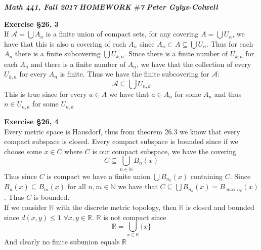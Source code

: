 \documentclass[12pt]{article}
\newenvironment{ques}[1]{\textbf{Exercise #1}\vspace{1 mm}\\ }{\bigskip}
\theoremstyle{definition}
\newcommand{\R}{\mathbb R}
\newcommand{\N}{\mathbb N}
\renewcommand{\a}{\alpha}
\begin{document}
\noindent \textit{\textbf{Math 441, Fall 2017}} \hspace{1.3cm}
\textit{\textbf{HOMEWORK $\#$7}} \hspace{1.3cm} \textit{\textbf{Peter
Gylys-Colwell}} 

\vspace{1cm}

\begin{ques}{\S 26, 3}
	If $\mathcal A = \bigcup A_n$ is a finite union of compact sets, for any
	covering $A = \bigcup U_\a$, we have that this is also a covering of each
	$A_n$ since $A_n \subset A \subseteq \bigcup U_\a$. Thus for each $A_n$
	there is a finite subcovering $\bigcup U_{k,n}$. Since there is a
	finite number of $U_{k,n}$ for each $A_n$ and there is a finite number of
	$A_n$, we have that the collection of every $U_{k,n}$ for every $A_n$ is
	finite. Thus we have the finite subcovering for $\mathcal A$:
	$$\mathcal A \subseteq \bigcup U_{n,k}$$
	This is true since for every $a \in A$ we have that $a \in A_n$ for some
	$A_n$ and thus $n \in U_{n,k}$ for some $U_{n,k}$
\end{ques}

\begin{ques}{\S 26, 4}
	Every metric space is Hausdorf, thus from theorem 26.3 we know that every
	compact subspace is closed. Every compact subspace is bounded since if we
	choose some $x \in C$ where $C$ is our compact subspace, we have the
	covering
	$$C \subseteq \bigcup_{n \in \N} B_n(x)$$
	Thus since $C$ is compact we have a finite union $\bigcup
	B_{n_k}(x)$ containing $C$. Since $B_n(x) \subseteq B_{m}(x)$ for all $n,m
	\in \N$ we have that $C \subseteq \bigcup B_{n_k}(x) = B_{\max{n_k}}(x)$.
	Thus $C$ is bounded.\\
	If we consider $\R$ with the discrete metric topology, then $\R$ is closed and
	bounded since $d(x,y) \leq 1$ $\forall x,y \in \R$. $\R$ is not compact since
	$$\R = \bigcup_{x \in \R} \{x\}$$
	And clearly no finite subunion equals $\R$
\end{ques}
\end{document}
